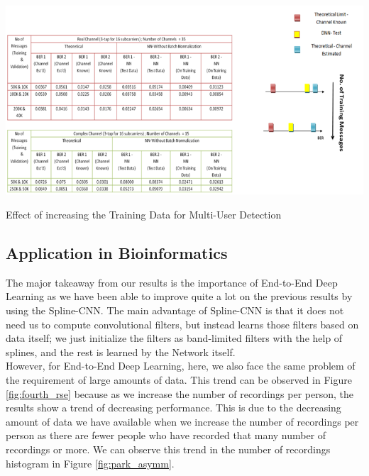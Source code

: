 \begin{table}[htbp]
  \centering
  \includegraphics[width=\textwidth]{./Figures/train_multi_user.png}
  \caption{Effect of increasing the Training Data for Multi-User Detection}
  \label{tbl:train_multi_user}
\end{table}
\subsection{Application in Bioinformatics}
The major takeaway from our results is the importance of End-to-End Deep Learning as we have been able to improve quite a lot on the previous results by using the Spline-CNN. The main advantage of Spline-CNN is that it does not  need us to compute convolutional filters, but instead learns those filters based on data itself; we just initialize the filters as band-limited filters with the help of splines, and the rest is learned by the Network itself.\\
However, for End-to-End Deep Learning, here, we also face the same problem of the requirement of large amounts of data. This trend can be observed in Figure \ref{fig:fourth_rse} because as we increase the number of recordings per person, the results show a trend of decreasing performance. This is due to the decreasing amount of data we have available when we increase the number of recordings per person as there are fewer people who have recorded that many number of recordings or more. We can observe this trend in the number of recordings histogram in Figure \ref{fig:park_asymm}.